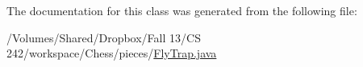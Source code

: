 The documentation for this class was generated from the following file\-:\begin{DoxyCompactItemize}
\item 
/\-Volumes/\-Shared/\-Dropbox/\-Fall 13/\-C\-S 242/workspace/\-Chess/pieces/\hyperlink{_fly_trap_8java}{Fly\-Trap.\-java}\end{DoxyCompactItemize}
